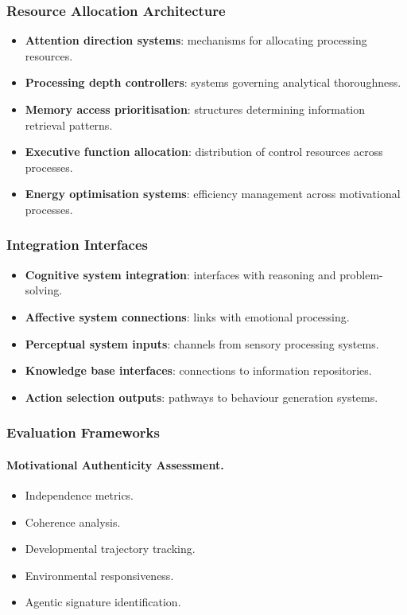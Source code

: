 \documentclass[12pt]{article}
\begin{document}
\subsubsection{Resource Allocation Architecture}

\begin{itemize}
\item \textbf{Attention direction systems}: mechanisms for allocating processing resources.
\item \textbf{Processing depth controllers}: systems governing analytical thoroughness.
\item \textbf{Memory access prioritisation}: structures determining information retrieval patterns.
\item \textbf{Executive function allocation}: distribution of control resources across processes.
\item \textbf{Energy optimisation systems}: efficiency management across motivational processes.
\end{itemize}

\subsubsection{Integration Interfaces}

\begin{itemize}
\item \textbf{Cognitive system integration}: interfaces with reasoning and problem-solving.
\item \textbf{Affective system connections}: links with emotional processing.
\item \textbf{Perceptual system inputs}: channels from sensory processing systems.
\item \textbf{Knowledge base interfaces}: connections to information repositories.
\item \textbf{Action selection outputs}: pathways to behaviour generation systems.
\end{itemize}

\subsubsection{Evaluation Frameworks}

\paragraph{Motivational Authenticity Assessment.}
\begin{itemize}
\item Independence metrics.
\item Coherence analysis.
\item Developmental trajectory tracking.
\item Environmental responsiveness.
\item Agentic signature identification.
\end{itemize}
\end{document}
